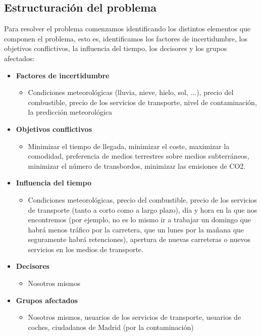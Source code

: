 \documentclass[12pt,a4paper,twoside,openright,titlepage,final]{article}
\begin{document}
\subsection{Estructuración del problema}

Para resolver el problema comenzamos identificando los distintos elementos que componen el problema, esto es, identificamos los factores de incertidumbre, los objetivos conflictivos, la influencia del tiempo, los decisores y los grupos afectados:\\

\begin{itemize}
	
	\item \textbf{Factores de incertidumbre}
	
	\begin{itemize}
		\item Condiciones meteorológicas (lluvia, nieve, hielo, sol, ...), precio del combustible, precio de los servicios de transporte, nivel de contaminación, la predicción meteorológica
	\end{itemize}
	
	\item \textbf{Objetivos conflictivos}
	
	\begin{itemize}
		\item Minimizar el tiempo de llegada, minimizar el coste, maximizar la comodidad, preferencia de medios terrestres sobre medios subterráneos, minimizar el número de transbordos, minimizar las emisiones de CO2.
	\end{itemize}
	
	\item \textbf{Influencia del tiempo}
	
	\begin{itemize}
		\item Condiciones meteorológicas, precio del combustible, precio de los servicios de transporte (tanto a corto como a largo plazo), día y hora en la que nos encontremos (por ejemplo, no es lo mismo ir a trabajar un domingo que habrá menos tráfico por la carretera, que un lunes por la mañana que seguramente habrá retenciones), apertura de nuevas carreteras o nuevos servicios en los medios de transporte.
	\end{itemize}
	
	\item \textbf{Decisores}
	
	\begin{itemize}
		\item Nosotros mismos
	\end{itemize}
	
	\item \textbf{Grupos afectados}
	
	\begin{itemize}
		\item Nosotros mismos, usuarios de los servicios de transporte, usuarios de coches, ciudadanos de Madrid (por la contaminación)
	\end{itemize}
\end{itemize}
\end{document}
